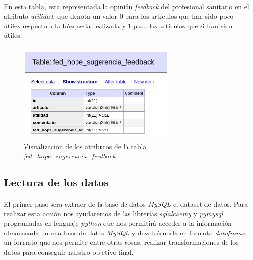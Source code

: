 \documentclass[10pt,a4paper,oneside]{book}
\begin{document}
\paragraph{}
En esta tabla, esta representada la opinión \textit{feedback} del profesional sanitario en el atributo \textit{utilidad}, que denota un valor 0 para los artículos que han sido poco útiles respecto a la búsqueda realizada y 1 para los artículos que si han sido útiles.

\paragraph{}
\begin{figure}[!htb]
  \centering
    \includegraphics[width=8cm]{images/metodologia_tabla_fed_hope_sugerencia_feedback.png}
    \caption{Visualización de los atributos de la tabla \textit{fed\_hope\_sugerencia\_feedback}}
  \label{tablaFedHopeSugerenciaFeedback}
\end{figure}

\paragraph{}


\newpage
\subsection{Lectura de los datos}

\paragraph{}
El primer paso sera extraer de la base de datos \textit{MySQL} el dataset de datos. Para realizar esta acción nos ayudaremos de las librerías \textit{sqlalchemy} y \textit{pymysql} programadas en lenguaje \textit{python} que nos permitirá acceder a la información almacenada en una base de datos \textit{MySQL} y devolvérnosla en formato \textit{dataframe}, un formato que nos permite entre otras cosas, realizar transformaciones de los datos para conseguir nuestro objetivo final.
\end{document}
